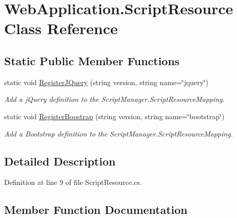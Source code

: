 \hypertarget{classWebApplication_1_1ScriptResource}{}\section{Web\+Application.\+Script\+Resource Class Reference}
\label{classWebApplication_1_1ScriptResource}
\subsection*{Static Public Member Functions}
\begin{DoxyCompactItemize}
\item 
static void \mbox{\hyperlink{classWebApplication_1_1ScriptResource_a1e4b776e84558b4515f46ed08949e665}{Register\+J\+Query}} (string version, string name=\char`\"{}jquery\char`\"{})
\begin{DoxyCompactList}\small\item\em Add a j\+Query definition to the {\ttfamily Script\+Manager.\+Script\+Resource\+Mapping}. \end{DoxyCompactList}\item 
static void \mbox{\hyperlink{classWebApplication_1_1ScriptResource_a6a74f3cbfe96f39c74eed2661a2277b5}{Register\+Boostrap}} (string version, string name=\char`\"{}bootstrap\char`\"{})
\begin{DoxyCompactList}\small\item\em Add a Bootstrap definition to the {\ttfamily Script\+Manager.\+Script\+Resource\+Mapping}. \end{DoxyCompactList}\end{DoxyCompactItemize}


\subsection{Detailed Description}


Definition at line 9 of file Script\+Resource.\+cs.



\subsection{Member Function Documentation}
\mbox{\label{classWebApplication_1_1ScriptResource_a6a74f3cbfe96f39c74eed2661a2277b5}} 
